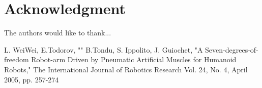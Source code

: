 \documentclass[conference]{IEEEtran}
\begin{document}
%


\appendices
\section{}


\section*{Acknowledgment}


The authors would like to thank...


\ifCLASSOPTIONcaptionsoff
  \newpage
\fi





%
%
%
\begin{thebibliography}{1}
L. WeiWei, E.Todorov, ""
B.Tondu, S. Ippolito, J. Guiochet, "A Seven-degrees-of-freedom Robot-arm Driven by Pneumatic Artificial Muscles for Humanoid Robots," The International Journal of Robotics Research Vol. 24, No. 4, April 2005, pp. 257-274
\end{thebibliography}
\end{document}
